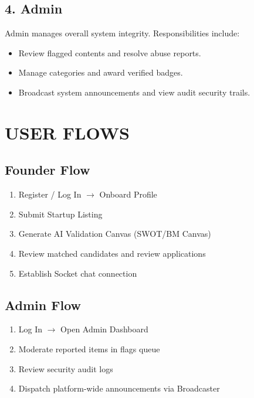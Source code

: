 \documentclass[12pt,a4paper]{report}
\begin{document}
\section{4. Admin}
Admin manages overall system integrity. Responsibilities include:
\begin{itemize}
    \item Review flagged contents and resolve abuse reports.
    \item Manage categories and award verified badges.
    \item Broadcast system announcements and view audit security trails.
\end{itemize}

\chapter{USER FLOWS}
\section{Founder Flow}
\begin{enumerate}
    \item Register / Log In $\rightarrow$ Onboard Profile
    \item Submit Startup Listing
    \item Generate AI Validation Canvas (SWOT/BM Canvas)
    \item Review matched candidates and review applications
    \item Establish Socket chat connection
\end{enumerate}

\section{Admin Flow}
\begin{enumerate}
    \item Log In $\rightarrow$ Open Admin Dashboard
    \item Moderate reported items in flags queue
    \item Review security audit logs
    \item Dispatch platform-wide announcements via Broadcaster
\end{enumerate}

\end{document}
